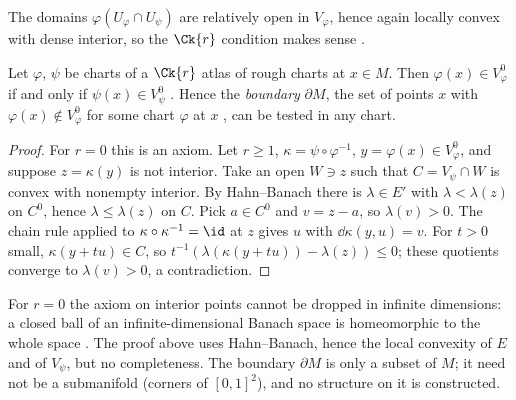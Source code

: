 The domains $\varphi(U_\varphi \cap U_\psi)$ are relatively open in $V_\varphi$, hence again
locally convex with dense interior, so the $\Ck{r}$ condition makes sense
\cite[Remark 3.5.2, p.~279]{GN26}.

\begin{theorem}
  \label{thm:rough-boundary}
  \leanok
  Let $\varphi$, $\psi$ be charts of a $\Ck{r}$ atlas of rough charts at $x \in M$. Then
  $\varphi(x) \in V_\varphi^0$ if and only if $\psi(x) \in V_\psi^0$
  \cite[Lemma 3.5.6, pp.~279--280]{GN26}. Hence the \emph{boundary} $\partial M$, the set of
  points $x$ with $\varphi(x) \notin V_\varphi^0$ for some chart $\varphi$ at $x$
  \cite[Definition 3.5.1(c), p.~278]{GN26}, can be tested in any chart.
\end{theorem}

\begin{proof}
  \leanok
  For $r = 0$ this is an axiom. Let $r \ge 1$, $\kappa = \psi \circ \varphi^{-1}$,
  $y = \varphi(x) \in V_\varphi^0$, and suppose $z = \kappa(y)$ is not interior. Take an open
  $W \ni z$ such that $C = V_\psi \cap W$ is convex with nonempty interior. By Hahn--Banach there
  is $\lambda \in E'$ with $\lambda < \lambda(z)$ on $C^0$, hence $\lambda \le \lambda(z)$ on
  $C$. Pick $a \in C^0$ and $v = z - a$, so $\lambda(v) > 0$. The chain rule applied to
  $\kappa \circ \kappa^{-1} = \id$ at $z$ gives $u$ with $\dd\kappa(y, u) = v$. For $t > 0$ small,
  $\kappa(y + tu) \in C$, so $t^{-1}(\lambda(\kappa(y + tu)) - \lambda(z)) \le 0$; these
  quotients converge to $\lambda(v) > 0$, a contradiction.
\end{proof}

\begin{remark}
  \label{rem:rough-subtleties}
  For $r = 0$ the axiom on interior points cannot be dropped in infinite dimensions: a closed
  ball of an infinite-dimensional Banach space is homeomorphic to the whole space
  \cite[Remark 3.5.9, p.~280]{GN26}. The proof above uses Hahn--Banach, hence the local
  convexity of $E$ and of $V_\psi$, but no completeness. The boundary $\partial M$ is only a
  subset of $M$; it need not be a submanifold (corners of $[0,1]^2$), and no structure on it is
  constructed.
\end{remark}


